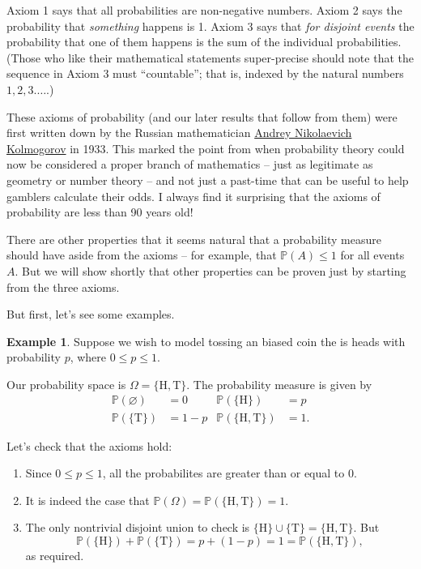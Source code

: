 \documentclass[
  a4paper,
]{book}
\providecommand{\tightlist}{%
  \setlength{\itemsep}{0pt}\setlength{\parskip}{0pt}}
\theoremstyle{definition}
\theoremstyle{definition}
\newtheorem{example}{Example}[chapter]
\theoremstyle{definition}
\theoremstyle{definition}
\theoremstyle{remark}
\begin{document}
Axiom 1 says that all probabilities are non-negative numbers. Axiom 2 says the probability that \emph{something} happens is 1. Axiom 3 says that \emph{for disjoint events} the probability that one of them happens is the sum of the individual probabilities. (Those who like their mathematical statements super-precise should note that the sequence in Axiom 3 must ``countable''; that is, indexed by the natural numbers \(1, 2, 3. \dots\).)

These axioms of probability (and our later results that follow from them) were first written down by the Russian mathematician \href{https://mathshistory.st-andrews.ac.uk/Biographies/Kolmogorov/}{Andrey Nikolaevich Kolmogorov} in 1933. This marked the point from when probability theory could now be considered a proper branch of mathematics -- just as legitimate as geometry or number theory -- and not just a past-time that can be useful to help gamblers calculate their odds. I always find it surprising that the axioms of probability are less than 90 years old!

There are other properties that it seems natural that a probability measure should have aside from the axioms -- for example, that \(\mathbb P(A) \leq 1\) for all events \(A\). But we will show shortly that other properties can be proven just by starting from the three axioms.

But first, let's see some examples.

\begin{example}

Suppose we wish to model tossing an biased coin the is heads with probability \(p\), where \(0 \leq p \leq 1\).

Our probability space is \(\Omega = \{\text{H}, \text{T}\}\). The probability measure is given by
\begin{align*}
   \mathbb P(\varnothing) &= 0  &  \mathbb P(\{\text{H}\}) &= p \\
   \mathbb P(\{\text{T}\}) &= 1 - p  &  \mathbb P(\{\text{H},\text{T}\})  &= 1 .
\end{align*}

Let's check that the axioms hold:

\begin{enumerate}
\def\labelenumi{\arabic{enumi}.}
\tightlist
\item
  Since \(0 \leq p \leq 1\), all the probabilites are greater than or equal to 0.
\item
  It is indeed the case that \(\mathbb P(\Omega) = \mathbb P(\{\text{H},\text{T}\}) = 1\).
\item
  The only nontrivial disjoint union to check is \(\{\text{H}\} \cup \{\text{T}\} = \{\text{H},\text{T}\}\). But
  \[ \mathbb P(\{\text{H}\}) + \mathbb P(\{\text{T}\}) = p + (1 - p) = 1 = \mathbb P(\{\text{H},\text{T}\}) , \]
  as required.
\end{enumerate}

\end{example}
\end{document}
